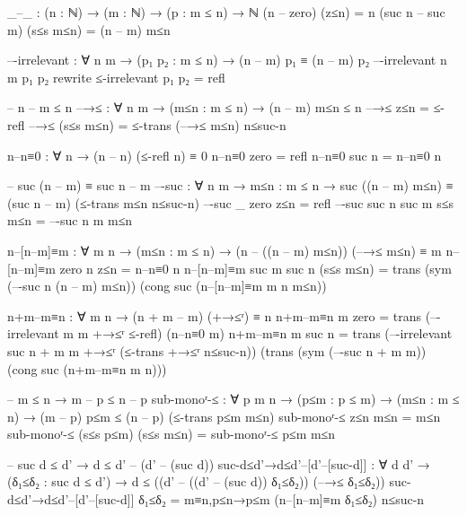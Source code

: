 \documentclass{article}
\begin{document}
\begin{prev}
\begin{code}
_–_ : (n : ℕ) → (m : ℕ) → (p : m ≤ n) → ℕ
(n – zero) (z≤n) = n
(suc n – suc m) (s≤s m≤n) = (n – m) m≤n

–-irrelevant : ∀ {n m} → (p₁ p₂ : m ≤ n) → (n – m) p₁ ≡ (n – m) p₂
–-irrelevant {n} {m} p₁ p₂ rewrite ≤-irrelevant p₁ p₂ = refl

-- n – m ≤ n
–→≤ : ∀ {n m} → (m≤n : m ≤ n) → (n – m) m≤n ≤ n
–→≤ z≤n = ≤-refl
–→≤ (s≤s m≤n) = ≤-trans (–→≤ m≤n) n≤suc-n

n–n≡0 : ∀ {n} → (n – n) (≤-refl {n}) ≡ 0
n–n≡0 {zero} = refl
n–n≡0 {suc n} = n–n≡0 {n}

-- suc (n – m) ­≡ suc n – m
–-suc : ∀ {n m} → {m≤n : m ≤ n} 
            → suc ((n – m) m≤n) ≡ (suc n – m) (≤-trans m≤n n≤suc-n)
–-suc {_} {zero} {z≤n} = refl
–-suc {suc n} {suc m} {s≤s m≤n} = –-suc {n} {m} {m≤n}

n–[n–m]≡m : ∀ {m n} → (m≤n : m ≤ n) 
                → (n – ((n – m) m≤n)) (–→≤ m≤n) ≡ m 
n–[n–m]≡m {zero} {n} z≤n = n–n≡0 {n}
n–[n–m]≡m {suc m} {suc n} (s≤s m≤n) = 
    trans (sym (–-suc {n} {(n – m) m≤n})) 
            (cong suc (n–[n–m]≡m {m} {n} m≤n))

n+m–m≡n : ∀ {m n} → (n + m – m) (+→≤ʳ) ≡ n
n+m–m≡n {m} {zero} = 
    trans (–-irrelevant {m} {m} +→≤ʳ ≤-refl) (n–n≡0 {m})
n+m–m≡n {m} {suc n} = 
    trans 
        (–-irrelevant {suc n + m} {m} +→≤ʳ (≤-trans +→≤ʳ n≤suc-n)) 
        (trans (sym (–-suc {n + m} {m})) 
                (cong suc (n+m–m≡n {m} {n})))

-- m ≤ n → m – p ≤ n – p
sub-monoʳ-≤ : ∀ {p m n} → (p≤m : p ≤ m) → (m≤n : m ≤ n) 
                → (m – p) p≤m ≤ (n – p) (≤-trans p≤m m≤n)
sub-monoʳ-≤ z≤n m≤n = m≤n
sub-monoʳ-≤ (s≤s p≤m) (s≤s m≤n) = sub-monoʳ-≤ p≤m m≤n

-- suc d ≤ d' → d ≤ d' – (d' – (suc d))
suc-d≤d'→d≤d'–[d'–[suc-d]] : ∀ {d d'} → (δ₁≤δ₂ : suc d ≤ d') 
            → d ≤ ((d' – ((d' – (suc d)) δ₁≤δ₂)) (–→≤ δ₁≤δ₂))
suc-d≤d'→d≤d'–[d'–[suc-d]] δ₁≤δ₂ = 
            m≡n,p≤n→p≤m (n–[n–m]≡m δ₁≤δ₂) n≤suc-n
\end{code}
\end{prev}
\end{document}
